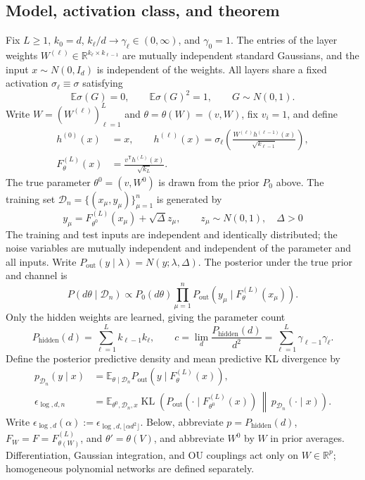 \documentclass[a4paper]{tufte-handout}
\newcommand{\E}{\mathbb E}
\newcommand{\R}{\mathbb R}
\newcommand{\Pall}{P_{\mathrm{hidden}}}
\newcommand{\Pout}{P_{\mathrm{out}}}
\DeclareMathOperator{\KL}{KL}
\begin{document}
\begin{fullwidth}

\section{Model, activation class, and theorem}
Fix $L\ge1$, $k_0=d$, $k_\ell/d\to\gamma_\ell\in(0,\infty)$, and $\gamma_0=1$.
The entries of the layer weights $W^{(\ell)}\in\R^{k_\ell\times k_{\ell-1}}$ are mutually independent standard Gaussians, and the input $x\sim N(0,I_d)$ is independent of the weights. All layers share a fixed activation $\sigma_\ell\equiv\sigma$ satisfying
\[
\E\sigma(G)=0,\qquad\E\sigma(G)^2=1,\qquad G\sim N(0,1).
\]
Write $W=(W^{(\ell)})_{\ell=1}^L$ and $\theta=\theta(W)=(v,W)$, fix $v_i=1$, and define
\begin{equation}\begin{aligned}
h^{(0)}(x)&=x,\qquad
h^{(\ell)}(x)=\sigma_\ell\!\left(\frac{W^{(\ell)}h^{(\ell-1)}(x)}{\sqrt{k_{\ell-1}}}\right),\\
F_\theta^{(L)}(x)&=\frac{v^{\mathsf T}h^{(L)}(x)}{\sqrt{k_L}}.
\end{aligned}\end{equation}
The true parameter $\theta^0=(v,W^0)$ is drawn from the prior $P_0$ above. The training set $\mathcal D_n=\{(x_\mu,y_\mu)\}_{\mu=1}^n$ is generated by
\[
y_\mu=F_{\theta^0}^{(L)}(x_\mu)+\sqrt\Delta z_\mu,\qquad
z_\mu\sim N(0,1),\quad\Delta>0
\]
The training and test inputs are independent and identically distributed; the noise variables are mutually independent and independent of the parameter and all inputs.
Write $\Pout(y\mid\lambda)=N(y;\lambda,\Delta)$. The posterior under the true prior and channel is
\[
P(d\theta\mid\mathcal D_n)\propto P_0(d\theta)
\prod_{\mu=1}^n\Pout\!\left(y_\mu\mid F_\theta^{(L)}(x_\mu)\right).
\]
Only the hidden weights are learned, giving the parameter count
\[
\Pall(d)=\sum_{\ell=1}^Lk_{\ell-1}k_\ell,\qquad
c=\lim_d\frac{\Pall(d)}{d^2}
=\sum_{\ell=1}^L\gamma_{\ell-1}\gamma_\ell.
\]
Define the posterior predictive density and mean predictive KL divergence by
\begin{equation}\begin{aligned}
p_{\mathcal D_n}(y\mid x)
&=\E_{\theta\mid\mathcal D_n}\Pout\!\left(y\mid F_\theta^{(L)}(x)\right),\\
\epsilon_{\log,d,n}
&=\E_{\theta^0,\mathcal D_n,x}\KL\!\left(
\Pout\!\left(\cdot\mid F_{\theta^0}^{(L)}(x)\right)
\,\middle\|\,p_{\mathcal D_n}(\cdot\mid x)\right).
\end{aligned}\end{equation}
Write $\epsilon_{\log,d}(\alpha):=\epsilon_{\log,d,\lfloor\alpha d^2\rfloor}$.
Below, abbreviate $p=\Pall(d)$, $F_W=F=F_{\theta(W)}^{(L)}$, and $\theta'=\theta(V)$, and abbreviate $W^0$ by $W$ in prior averages. Differentiation, Gaussian integration, and OU couplings act only on $W\in\R^p$; homogeneous polynomial networks are defined separately.


\end{fullwidth}
\end{document}
